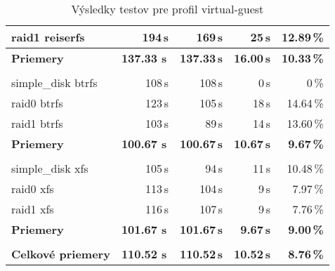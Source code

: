 \begin{table}[H]
\begin{center}
\begin{tabular}{|l|r r r r|}
    raid1 reiserfs & 194\,s & 169\,s & 25\,s & 12.89\,\% \\
    \hline
    \textbf{Priemery} & \textbf{137.33 s}\,& \textbf{137.33\,s} & \textbf{16.00\,s} & \textbf{10.33\,\%} \\
    \hline & \\[-1em]\hline
    simple\_disk btrfs & 108\,s & 108\,s & 0\,s & 0\,\% \\
    raid0 btrfs & 123\,s & 105\,s & 18\,s & 14.64\,\% \\
    raid1 btrfs & 103\,s & 89\,s & 14\,s & 13.60\,\% \\
    \hline
    \textbf{Priemery} & \textbf{100.67 s}\,& \textbf{100.67\,s} & \textbf{10.67\,s} & \textbf{9.67\,\%} \\
    \hline & \\[-1em]\hline
    simple\_disk xfs & 105\,s & 94\,s & 11\,s & 10.48\,\% \\
    raid0 xfs & 113\,s & 104\,s & 9\,s & 7.97\,\% \\
    raid1 xfs & 116\,s & 107\,s & 9\,s & 7.76\,\% \\
    \hline
    \textbf{Priemery} & \textbf{101.67 s}\,& \textbf{101.67\,s} & \textbf{9.67\,s} & \textbf{9.00\,\%} \\
    \hline & \\[-1em]\hline
    \textbf{Celkové priemery} & \textbf{110.52 s}\,& \textbf{110.52\,s} & \textbf{10.52\,s} & \textbf{8.76\,\%} \\
    \hline
\end{tabular}
\caption{Výsledky testov pre profil virtual-guest}
\label{tab:results-xfs}
\end{center}
\end{table}

%
%

